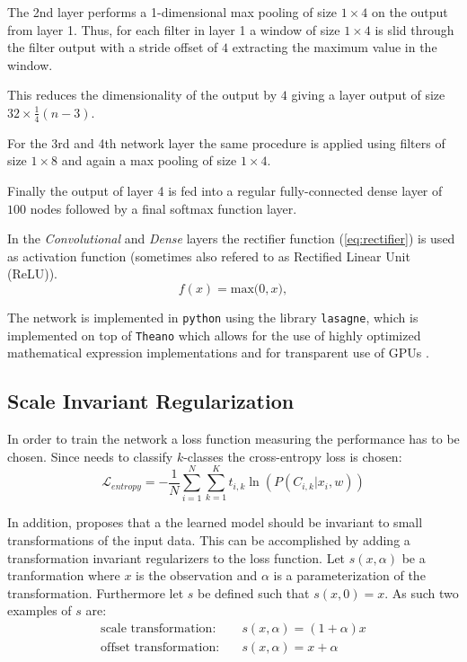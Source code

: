 The 2nd layer performs a 1-dimensional max pooling of size $1 \times 4$ on the output from layer 1. Thus, for each filter in layer 1 a window of size $1 \times 4$ is slid through the filter output with a stride offset of $4$ extracting the maximum value in the window.

This reduces the dimensionality of the output by $4$ giving a layer output of size $32 \times \frac{1}{4}(n-3)$.

For the 3rd and 4th network layer the same procedure is applied using filters of size $1 \times 8$ and again a max pooling of size $1 \times 4$.

Finally the output of layer 4 is fed into a regular fully-connected dense layer of $100$ nodes followed by a final softmax function layer.

In the \emph{Convolutional} and \emph{Dense} layers the rectifier function (\cref{eq:rectifier}) is used as activation function (sometimes also refered to as Rectified Linear Unit (ReLU)).
\begin{equation}
  f(x) = \text{max(}0, x\text{)},
  \label{eq:rectifier}
\end{equation}


The network is implemented in \texttt{python} using the library \texttt{lasagne}, which is implemented on top of \texttt{Theano} which allows for the use of highly optimized mathematical expression implementations and for transparent use of GPUs \cite{theano}.

\subsection{Scale Invariant Regularization}

In order to train the network a loss function measuring the performance has to be chosen. Since needs to classify $k$-classes the cross-entropy loss is chosen:
\begin{equation}
\mathcal{L}_{entropy} = - \frac{1}{N} \sum_{i=1}^N \sum_{k=1}^K t_{i,k} \ln(P(C_{i,k} | x_i, w))
\end{equation}

In addition, \cite{scale-invariante} proposes that a the learned model should be invariant to small transformations of the input data. This can be accomplished by adding a transformation invariant regularizers to the loss function. Let $s(x, \alpha)$  be a tranformation where $x$ is the observation and $\alpha$ is a parameterization of the transformation. Furthermore let $s$ be defined such that $s(x, 0) = x$. As such two examples of $s$ are:
\begin{align}
\text{scale transformation:}&\quad s(x, \alpha) = (1+\alpha) x\\
\text{offset transformation:}&\quad s(x, \alpha) = x + \alpha
\end{align}

